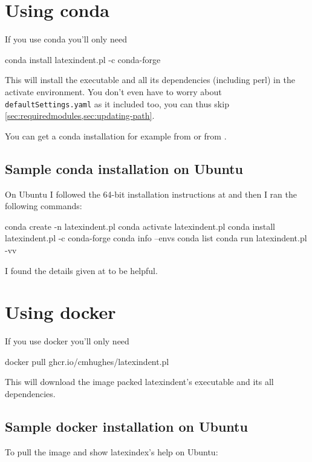  \section{Using conda}\label{sec:app:conda}
  If you use conda you'll only need
  \begin{commandshell}
conda install latexindent.pl -c conda-forge
\end{commandshell}
  This will install the executable and all its dependencies (including perl) in the
  activate environment. You don't even have to worry about \texttt{defaultSettings.yaml} as
  it included too, you can thus skip \cref{sec:requiredmodules,sec:updating-path}.

  You can get a conda installation for example from \cite{conda} or from \cite{anacoda}.

 \subsection{Sample conda installation on Ubuntu}
  On Ubuntu I followed the 64-bit installation instructions at \cite{condainstallubuntu}
  and then I ran the following commands:
  \begin{commandshell}
conda create -n latexindent.pl
conda activate latexindent.pl
conda install latexindent.pl -c conda-forge
conda info --envs
conda list
conda run latexindent.pl -vv
\end{commandshell}
  I found the details given at \cite{condainstallhelp} to be helpful.

 \section{Using docker}\label{sec:app:docker}
  If you use docker you'll only need
  \begin{commandshell}
docker pull ghcr.io/cmhughes/latexindent.pl
\end{commandshell}
  This will download the image packed latexindent's executable and its all dependencies.

 \subsection{Sample docker installation on Ubuntu}
  To pull the image and show latexindex's help on Ubuntu:


